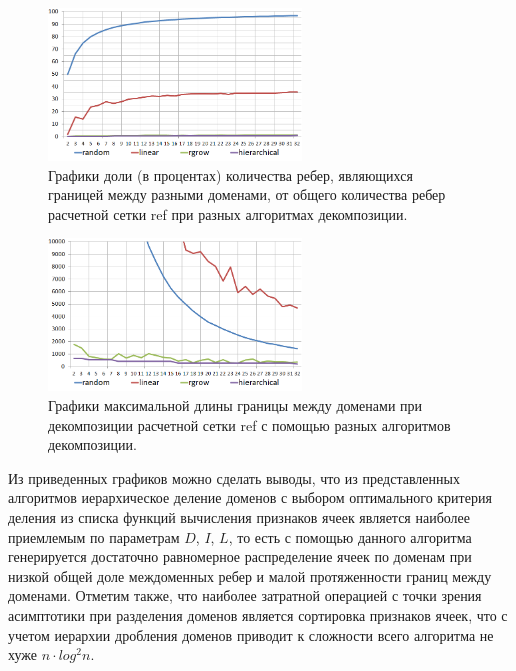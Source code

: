 \begin{figure}[ht]
	\centering
		\includegraphics[width=0.6\textwidth]{./pics/text_2_decompsurf/air_inlet_inter_edges.png}
	\caption{Графики доли (в процентах) количества ребер, являющихся границей между разными доменами, от общего количества ребер расчетной сетки ref при разных алгоритмах декомпозиции.}
	\label{fig:text_2_decompsurf_air_inlet_inter_edges}
\end{figure}

\begin{figure}[ht]
	\centering
		\includegraphics[width=0.6\textwidth]{./pics/text_2_decompsurf/air_inlet_max_border.png}
	\caption{Графики максимальной длины границы между доменами при декомпозиции расчетной сетки ref с помощью разных алгоритмов декомпозиции.}
	\label{fig:text_2_decompsurf_air_inlet_max_border}
\end{figure}

Из приведенных графиков можно сделать выводы, что из представленных алгоритмов иерархическое деление доменов с выбором оптимального критерия деления из списка функций вычисления признаков ячеек является наиболее приемлемым по параметрам $D$, $I$, $L$, то есть с помощью данного алгоритма генерируется достаточно равномерное распределение ячеек по доменам при низкой общей доле междоменных ребер и малой протяженности границ между доменами.
Отметим также, что наиболее затратной операцией с точки зрения асимптотики при разделения доменов является сортировка признаков ячеек, что с учетом иерархии дробления доменов приводит к сложности всего алгоритма не хуже $n \cdot log^2 n$.


